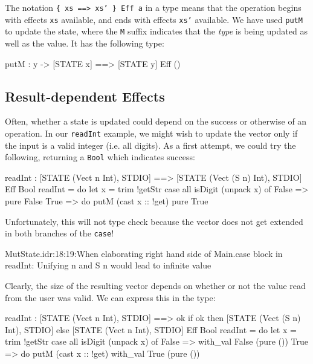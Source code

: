 \noindent
The notation \texttt{\{ xs ==> xs' \} Eff a} in a type means that the
operation begins with effects \texttt{xs} available, and ends with effects
\texttt{xs'} available. We have used \texttt{putM} to update the state, where
the \texttt{M} suffix indicates that the \emph{type} is being updated as well
as the value. It has the following type:

\begin{code}
putM : y -> { [STATE x] ==> [STATE y] } Eff () 
\end{code}

\subsection{Result-dependent Effects}

Often, whether a state is updated could depend on the success or otherwise
of an operation. In our \texttt{readInt} example, we might wish to update
the vector only if the input is a valid integer (i.e. all digits). As a
first attempt, we could try the following, returning a \texttt{Bool} which
indicates success:

\begin{code}
readInt : { [STATE (Vect n Int), STDIO] ==>
            [STATE (Vect (S n) Int), STDIO] } Eff Bool
readInt = do let x = trim !getStr
             case all isDigit (unpack x) of
                  False => pure False
                  True => do putM (cast x :: !get)
                             pure True
\end{code}

\noindent
Unfortunately, this will not type check because the vector does not get
extended in both branches of the \texttt{case}!

\begin{code}
MutState.idr:18:19:When elaborating right hand side of Main.case 
block in readInt:
Unifying n and S n would lead to infinite value
\end{code}

\noindent
Clearly, the size of the resulting vector depends on whether or not the
value read from the user was valid. We can express this in the type:

\begin{code}
readInt : { [STATE (Vect n Int), STDIO] ==>
            {ok} if ok then [STATE (Vect (S n) Int), STDIO]
                       else [STATE (Vect n Int), STDIO] } Eff Bool
readInt = do let x = trim !getStr
             case all isDigit (unpack x) of
                  False => with_val False (pure ())
                  True => do putM (cast x :: !get)
                             with_val True (pure ())
\end{code}

